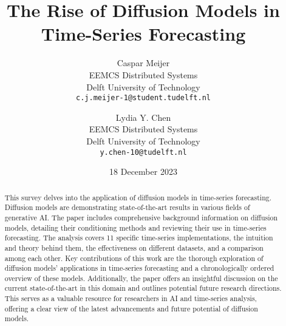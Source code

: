 \documentclass{article}
\title{The Rise of Diffusion Models in Time-Series Forecasting}
\author{Caspar Meijer \\
        EEMCS Distributed Systems \\
        Delft University of Technology \\
        \texttt{c.j.meijer-1@student.tudelft.nl} 
        \and
        Lydia Y. Chen \\
        EEMCS Distributed Systems \\
        Delft University of Technology \\
        \texttt{y.chen-10@tudelft.nl}}
\date{18 December 2023}
\begin{document}
\maketitle

\begin{abstract}
This survey delves into the application of diffusion models in time-series forecasting. Diffusion models are demonstrating state-of-the-art results in various fields of generative AI.
The paper includes comprehensive background information on diffusion models, detailing their conditioning methods and reviewing their use in time-series forecasting. The analysis covers 11 specific time-series implementations, the intuition and theory behind them, the effectiveness on different datasets, and a comparison among each other.
Key contributions of this work are the thorough exploration of diffusion models' applications in time-series forecasting and a chronologically ordered overview of these models. Additionally, the paper offers an insightful discussion on the current state-of-the-art in this domain and outlines potential future research directions. This serves as a valuable resource for researchers in AI and time-series analysis, offering a clear view of the latest advancements and future potential of diffusion models.
\end{abstract}


 \newpage




\printbibliography
\end{document}
